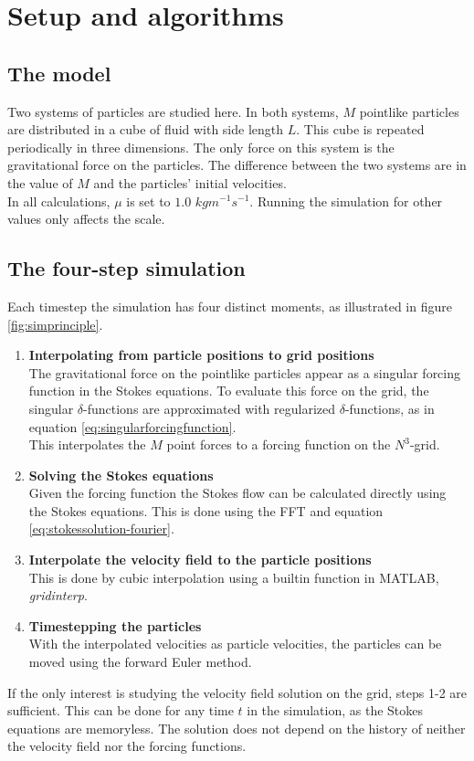 \documentclass[a4paper,
twoside=false,abstract=false,numbers=noenddot,
titlepage=false,headings=small,parskip=half,version=last]{scrartcl}
\begin{document}
\section{Setup and algorithms}

\subsection{The model}
Two systems of particles are studied here.
In both systems, $M$ pointlike particles are distributed in a cube of fluid with side length $L$.
This cube is repeated periodically in three dimensions.
The only force on this system is the gravitational force on the particles.
The difference between the two systems are in the value of $M$ and the particles' initial velocities.\\
In all calculations, $\mu$ is set to $1.0$ $kgm^{-1}s^{-1}$.
Running the simulation for other values only affects the scale.

\subsection{The four-step simulation}
Each timestep the simulation has four distinct moments, as illustrated in figure \ref{fig:simprinciple}.
\begin{enumerate}
\item{\bfseries Interpolating from particle positions to grid positions}\\
The gravitational force on the pointlike particles appear as a singular forcing function in the Stokes equations.
To evaluate this force on the grid, the singular $\delta$-functions are approximated with regularized $\delta$-functions, as in equation \eqref{eq:singularforcingfunction}.\\
This interpolates the $M$ point forces to a forcing function on the $N^3$-grid.

\item{\bfseries Solving the Stokes equations}\\
Given the forcing function the Stokes flow can be calculated directly using the Stokes equations. This is done using the FFT and equation \eqref{eq:stokessolution-fourier}.

\item{\bfseries Interpolate the velocity field to the particle positions}\\
This is done by cubic interpolation using a builtin function in MATLAB, \emph{gridinterp}.

\item{\bfseries Timestepping the particles}\\
With the interpolated velocities as particle velocities, the particles can be moved using the forward Euler method.
\end{enumerate}
If the only interest is studying the velocity field solution on the grid, steps 1-2 are sufficient. This can be done for any time $t$ in the simulation, as the Stokes equations are memoryless.
The solution does not depend on the history of neither the velocity field nor the forcing functions.
\end{document}

